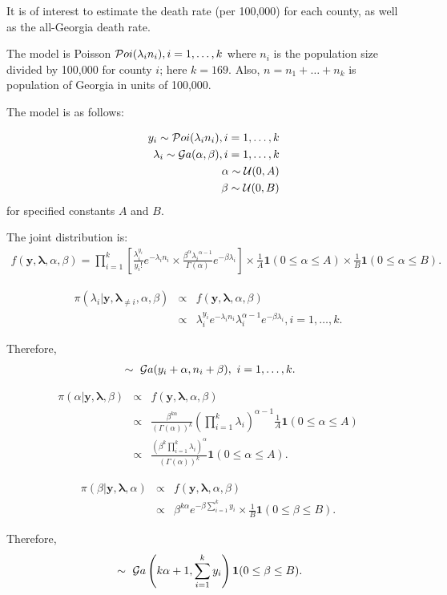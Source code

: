 \documentclass[12pt]{article}
\newcommand{\ba}{\begin{eqnarray*}}
\newcommand{\ea}{\end{eqnarray*}}
\begin{document}
 It is of interest to estimate the death rate (per 100,000) for each county,
 as well as the all-Georgia death rate.

 The model is Poisson ${\cal P}oi(\lambda_i n_i), i = 1,\dots, k$ where
 $n_i$ is the population size divided by 100,000 for  county $i$; here $k=169.$
 Also, $n = n_1 + \dots + n_k$ is population of Georgia in units of 100,000.

 The model is as follows:

 \ba
&&  y_i \sim {\cal P}oi(\lambda_i n_i), i = 1,\dots, k \\
&& \lambda_i \sim {\cal G}a(\alpha, \beta), i = 1,\dots, k \\
&& \alpha \sim {\cal U}(0, A)\\
&& \beta \sim {\cal U}(0, B)
\ea
for specified constants $A$ and $B$.


The joint distribution is:
\ba
f({\bm y},{\bm \lambda}, \alpha, \beta) =  \prod_{i=1}^k \left[\frac{\lambda_i ^{y_i}}{y_i!} e^{-\lambda_i n_i}
\times \frac{ \beta^\alpha {\lambda_i}^{\alpha-1}}{\Gamma(\alpha)} e^{-\beta \lambda_i}\right]
\times \frac{1}{A} {\bm 1}(0 \leq \alpha \leq A) \times  \frac{1}{B} {\bm 1}(0 \leq \alpha \leq B).
\ea

\ba
\pi(\lambda_i |{\bm y},{\bm \lambda}_{\ne i}, \alpha, \beta) &\propto&  f({\bm y},{\bm \lambda}, \alpha, \beta) \\
&\propto& \lambda_i^{y_i} e^{- \lambda_i n_i} \lambda_i^{\alpha -1} e^{-\beta \lambda_i}, i=1, \dots, k.
\ea

 Therefore,
 \ba
[ \lambda_i |{\bm y},{\bm \lambda}_{\ne i}, \alpha, \beta] ~\sim~ {\cal G}a(y_i + \alpha, n_i + \beta), ~ i=1,\dots, k.
\ea


\ba
\pi(\alpha |{\bm y},{\bm \lambda},   \beta)  &\propto&  f({\bm y},{\bm \lambda}, \alpha, \beta) \\
&\propto&  \frac{\beta^{k \alpha}}{(\Gamma(\alpha))^k}
\left( \prod_{i=1}^k \lambda_i \right)^{\alpha -1} \frac{1}{A} {\bm 1}(0 \leq \alpha \leq A) \\
&\propto& \frac{\left(\beta^k \prod_{i=1}^k \lambda_i \right)^\alpha}{(\Gamma(\alpha))^k}
  {\bm 1}(0 \leq \alpha \leq A).
 \ea


\ba
\pi(\beta |{\bm y},{\bm \lambda}, \alpha) &\propto&  f({\bm y},{\bm \lambda}, \alpha,\beta) \\
&\propto& \beta^{k \alpha} e^{- \beta \sum_{i=1}^k y_i}   \times  \frac{1}{B} {\bm 1}(0 \leq \beta \leq B).
\ea

 Therefore,
 \ba
[ \beta |{\bm y},{\bm \lambda}, \alpha] ~\sim~ {\cal G}a\left(k \alpha+1, \sum_{i=1}^k y_i \right)
 {\bm 1}(0 \leq \beta \leq B).
\ea
\end{document}
